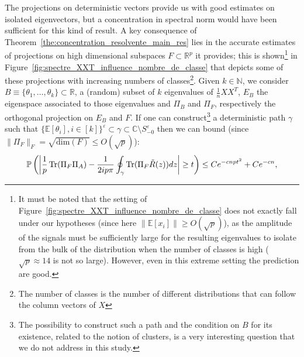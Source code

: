\documentclass[a4papaer, titlepage]{book}
\begin{document}
The projections on deterministic vectors provide us with good estimates on isolated eigenvectors, but a concentration in spectral norm would have been sufficient for this kind of result. A key consequence of Theorem~\ref{the:concentration_resolvente_main_res} lies in the accurate estimates of projections on high dimensional subspaces $F \subset \mathbb R^p$ it provides; this is shown\footnote{It must be noted that the setting of Figure~\ref{fig:spectre_XXT_influence_nombre_de_classe} does not exactly fall under our hypotheses (since here $\|\mathbb E[x_i] \| \geq O(\sqrt p)$), as the amplitude of the signals must be sufficiently large for the resulting eigenvalues to isolate from the bulk of the distribution when the number of classes is high ($\sqrt{p} \approx 14$ is not so large). However, even in this extreme setting the prediction are good.} in Figure~\ref{fig:spectre_XXT_influence_nombre_de_classe} that depicts some of these projections with increasing numbers of classes\footnote{The number of classes is the number of different distributions that can follow the column vectors of $X$}. Given $k \in \mathbb N$, we consider $B  \equiv \{ \theta_1, \ldots, \theta_k\} \subset \mathbb R$, a (random) subset of $k$ eigenvalues of $\frac{1}{n}XX^T$, $E_B$ the eigenspace associated to those eigenvalues and $\Pi_B$ and $\Pi_F$, respectively the orthogonal projection on $E_B$ and $F$. If one can construct\footnote{The possibility to construct such a path and the condition on $B$ for its existence, related to the notion of clusters, is a very interesting question that we do not address in this study.} a deterministic path $\gamma$ such that $\{\mathbb E [\theta_i], i \in [k]\}^\varepsilon \subset \gamma \subset \mathbb C \setminus S_{-0}^\varepsilon$ then we can bound (since $\|\Pi_F\|_F = \sqrt{\text{dim}(F)}\leq O(\sqrt p)$):
\begin{align*}
  \mathbb P \left( \left\vert \frac{1}{p}\operatorname{Tr}(\Pi_F\Pi_A) - \frac{1}{2ip\pi} \oint_\gamma \operatorname{Tr}(\Pi_F \tilde R(z)) dz\right\vert\geq t\right) \leq C e^{-cnpt^2} + C e^{-cn},
\end{align*}
\end{document}
